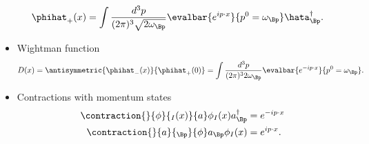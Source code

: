 \begin{itemize}
\begin{dmath}
\begin{aligned}
\phihat_{+}(x) &=
\int \frac{d^3 p}{(2 \pi)^3 \sqrt{2 \omega_\Bp}}
\evalbar{
e^{i p \cdot x} }{p^0 = \omega_\Bp} \hata^\dagger_\Bp.
\end{aligned}
\end{dmath}
\item Wightman function
\begin{equation}\label{eqn:usefulFormulas:640}
D(x)
= \antisymmetric{\phihat_{-}(x)}{\phihat_{+}(0)}
=
\int \frac{d^3 p}{(2 \pi)^3 2 \omega_\Bp}
\evalbar{ e^{-i p \cdot x} }{p^0 = \omega_\Bp}.
\end{equation}
\item Contractions with momentum states
\begin{dmath}\label{eqn:usefulFormulas:n}
\begin{aligned}
\contraction{}{\phi}{{}_I(x)}{a}
\phi_I(x) a^\dagger_{\Bp}
&= e^{-i p \cdot x} \\
\contraction{}{a}{{}_\Bp}{\phi}
a_\Bp \phi_I(x)
&= e^{i p \cdot x}.
\end{aligned}
\end{dmath}
\end{itemize}
